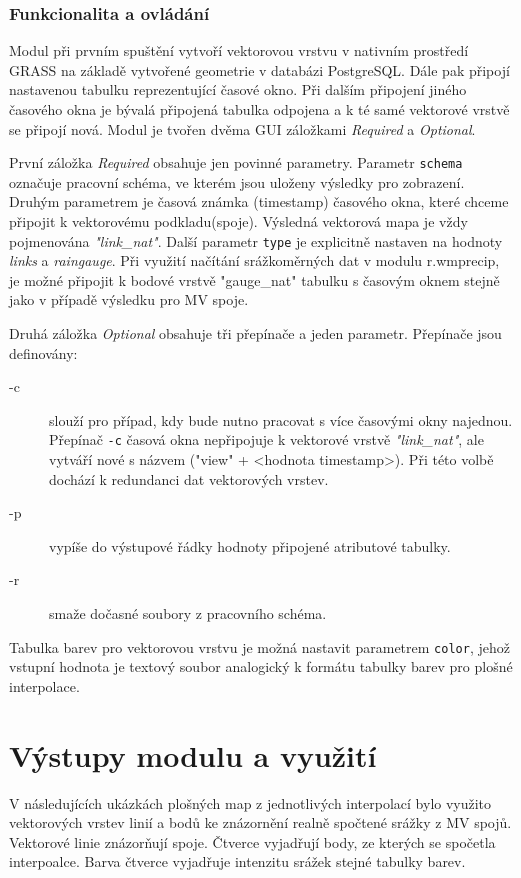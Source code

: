 \documentclass[a4paper,12pt,oneside]{report}
\begin{document}
\subsubsection{Funkcionalita a ovládání}
Modul při prvním spuštění vytvoří vektorovou vrstvu v nativním prostředí GRASS na základě vytvořené geometrie v databázi PostgreSQL. Dále pak připojí nastavenou tabulku reprezentující časové okno. Při dalším připojení jiného časového okna je bývalá připojená tabulka odpojena a k té samé vektorové vrstvě se připojí nová. Modul je tvořen dvěma GUI záložkami \textit{Required} a \textit{Optional}. 

První záložka \textit{Required} obsahuje jen povinné parametry.  Parametr \texttt{schema}  označuje pracovní schéma, ve kterém jsou uloženy výsledky pro  zobrazení. Druhým parametrem je časová známka (timestamp) časového okna, které chceme připojit k vektorovému podkladu(spoje). Výsledná vektorová mapa je vždy pojmenována \textit{"link\_nat"}. Další parametr  \texttt{type} je  explicitně nastaven na hodnoty \emph{links} a \emph{raingauge}. Při využití načítání srážkoměrných dat v modulu r.wmprecip, je možné připojit k bodové vrstvě "gauge\_nat" tabulku s časovým oknem stejně jako v případě výsledku pro MV spoje.

Druhá záložka \textit{Optional} obsahuje  tři přepínače a jeden parametr.  Přepínače jsou definovány:
\begin{description}
\item[-c]   slouží pro případ, kdy bude nutno pracovat s více časovými okny najednou. Přepínač \texttt{-c} časová okna nepřipojuje k vektorové vrstvě \textit{"link\_nat"}, ale vytváří nové s názvem ("view" + <hodnota timestamp>). Při této volbě dochází k redundanci dat vektorových vrstev.
\item[-p] vypíše do výstupové řádky hodnoty připojené atributové tabulky.
\item[-r] smaže dočasné  soubory z pracovního schéma.
\end{description}

Tabulka barev pro vektorovou vrstvu je možná nastavit parametrem \texttt{color}, jehož vstupní hodnota je textový soubor  analogický k formátu tabulky barev pro plošné interpolace.

\section{Výstupy modulu a využití}

V následujících ukázkách plošných map z jednotlivých interpolací bylo využito vektorových vrstev linií a bodů ke znázornění realně spočtené srážky z MV spojů. Vektorové linie znázorňují spoje. Čtverce vyjadřují body, ze kterých se spočetla interpoalce. Barva čtverce vyjadřuje intenzitu srážek stejné tabulky barev. 
\end{document}
